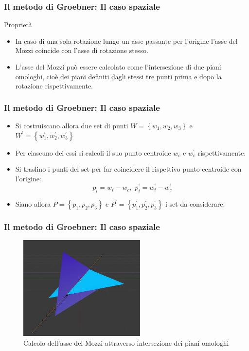 \documentclass{beamer}
\begin{document}
\begin{frame}
\frametitle{Il metodo di Groebner: Il caso spaziale}
\begin{block}{Proprietà}
	\begin{itemize}
		\item In caso di una sola rotazione lungo un asse passante per l'origine l'asse del Mozzi coincide con l'asse di rotazione stesso.
		
		\item L'asse del Mozzi può essere calcolato come l'intersezione di due piani omologhi, cioè dei piani definiti dagli stessi tre punti prima e dopo la rotazione rispettivamente.
	\end{itemize}
\end{block}
\end{frame}

\begin{frame}
\frametitle{Il metodo di Groebner: Il caso spaziale}
\begin{itemize}
	\item Si costruiscano allora due set di punti $W = \left\lbrace w_1, w_2, w_3 \right\rbrace$ e $W^{'} = \left\lbrace w_1^{'}, w_2^{'}, w_3^{'} \right\rbrace$
	
	\item Per ciascuno dei essi si calcoli il suo punto centroide $w_c$ e $w_c^{'}$ rispettivamente.
	
	\item Si traslino i punti del set per far coincidere il rispettivo punto centroide con l'origine:
	\begin{equation}
	p_i = w_i - w_c, \, \, 
	p_i^{'} = w_i^{'} - w_c^{'}
	\end{equation}
	\item Siano allora $P = \left\lbrace p_1, p_2, p_3 \right\rbrace$ e $P^{'} = \left\lbrace p_1^{'}, p_2^{'}, p_3^{'} \right\rbrace$ i set da considerare.
\end{itemize}
\end{frame}

\begin{frame}
	\frametitle{Il metodo di Groebner: Il caso spaziale}
	
	\begin{figure}[h]
		\centering
		\includegraphics[width=180pt]{imgs/AsseMozzi.jpg}
		\caption{Calcolo dell'asse del Mozzi attraverso intersezione dei piani omologhi}
		\label{rot:gb:imgMozzi}
	\end{figure} 
\end{frame}
\end{document}
